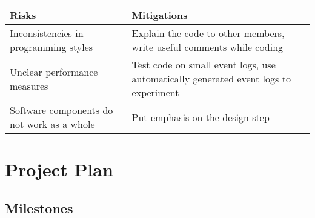 \documentclass[notitlepage]{article}
\begin{document}
\begin{flushleft}
\begin{tabularx}{12cm}{|X|X|}
\hline
\textbf{Risks} &\textbf{Mitigations}\\
\hline
Inconsistencies in programming styles & Explain the code to other members, write useful comments while coding\\
\hline
Unclear performance measures & Test code on small event logs, use automatically generated event logs to experiment \\
\hline
Software components do not work as a whole & Put emphasis on the design step \\ 
\hline
\end{tabularx}






\section{Project Plan}

\subsection{Milestones}


\end{flushleft}
\end{document}
